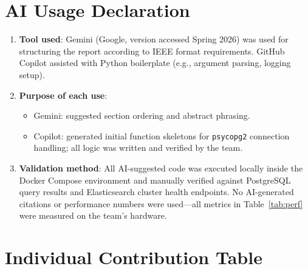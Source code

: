\documentclass[conference]{IEEEtran}
\begin{document}
\section{AI Usage Declaration}

\begin{enumerate}
  \item \textbf{Tool used}: Gemini (Google, version accessed Spring 2026) was
    used for structuring the report according to IEEE format requirements.
    GitHub Copilot assisted with Python boilerplate (e.g., argument parsing,
    logging setup).
  \item \textbf{Purpose of each use}:
    \begin{itemize}
      \item Gemini: suggested section ordering and abstract phrasing.
      \item Copilot: generated initial function skeletons for
        \texttt{psycopg2} connection handling; all logic was written and
        verified by the team.
    \end{itemize}
  \item \textbf{Validation method}: All AI-suggested code was executed locally
    inside the Docker Compose environment and manually verified against
    PostgreSQL query results and Elasticsearch cluster health endpoints.
    No AI-generated citations or performance numbers were used---all metrics
    in Table~\ref{tab:perf} were measured on the team's hardware.
\end{enumerate}

\section*{Individual Contribution Table}
\end{document}
